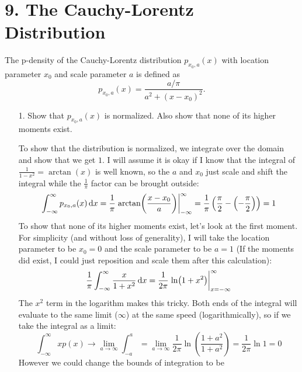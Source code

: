 \documentclass[a4paper,twoside]{article}
\begin{document}
\section*{9. The Cauchy-Lorentz Distribution}
The p-density of the Cauchy-Lorentz distribution $ p_{x_0, a}(x) $ with location parameter $ x_0 $ and scale parameter $ a $ is defined as
\begin{equation}
    p_{x_0, a}(x) = \frac{a / \pi}{a^2 + (x - x_0)^2}.
\end{equation}
\begin{itemize}
    \item[1.] Show that $ p_{x_0, a}(x) $ is normalized. Also show that none of its higher moments exist.
        \begin{problem}
            To show that the distribution is normalized, we integrate over the domain and show that we get $ 1 $. I will assume it is okay if I know that the integral of $ \frac{1}{1 - x^2} = \arctan(x) $ is well known, so the $ a $ and $ x_0 $ just scale and shift the integral while the $ \frac{1}{\pi} $ factor can be brought outside:
            \begin{equation}
                \int_{- \infty}^{\infty} p_{x_0, a}(x) \dd{x} = \frac{1}{\pi} \eval{\arctan(\frac{x - x_0}{a})}_{- \infty}^{\infty} = \frac{1}{\pi} \left( \frac{\pi}{2} - \left( - \frac{\pi}{2} \right) \right) = 1
            \end{equation}
        To show that none of its higher moments exist, let's look at the first moment. For simplicity (and without loss of generality), I will take the location parameter to be $ x_0 = 0 $ and the scale parameter to be $ a = 1 $ (If the moments did exist, I could just reposition and scale them after this calculation):
        \begin{equation}
            \frac{1}{\pi} \int_{- \infty}^{\infty} \frac{x}{1 + x^2} \dd{x} = \frac{1}{2\pi} \eval{\ln(1 + x^2)}_{x= - \infty}^{\infty}
        \end{equation}
        The $ x^2 $ term in the logarithm makes this tricky. Both ends of the integral will evaluate to the same limit ($ \infty $) at the same speed (logarithmically), so if we take the integral as a limit:
        \begin{equation}
            \int_{- \infty}^{\infty} x p(x) \to \lim_{a \to \infty} \int_{-a}^{a} = \lim_{a \to \infty} \frac{1}{2 \pi} \ln(\frac{1+ a^2}{1 + a^2}) = \frac{1}{2 \pi} \ln{1} = 0
        \end{equation}
        However we could change the bounds of integration to be

\end{problem}
\end{itemize}
\end{document}
